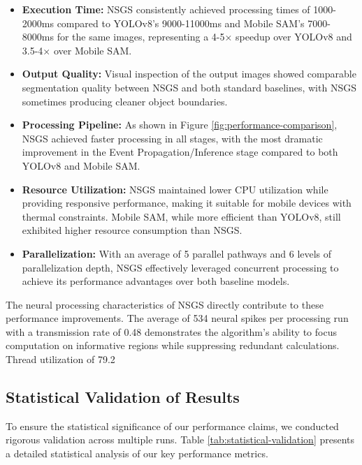 \documentclass[conference]{IEEEtran}
\begin{document}
\begin{itemize}
    \item \textbf{Execution Time:} NSGS consistently achieved processing times of 1000-2000ms compared to YOLOv8's 9000-11000ms and Mobile SAM's 7000-8000ms for the same images, representing a 4-5× speedup over YOLOv8 and 3.5-4× over Mobile SAM.
    
    \item \textbf{Output Quality:} Visual inspection of the output images showed comparable segmentation quality between NSGS and both standard baselines, with NSGS sometimes producing cleaner object boundaries.
    
    \item \textbf{Processing Pipeline:} As shown in Figure \ref{fig:performance-comparison}, NSGS achieved faster processing in all stages, with the most dramatic improvement in the Event Propagation/Inference stage compared to both YOLOv8 and Mobile SAM.
    
    \item \textbf{Resource Utilization:} NSGS maintained lower CPU utilization while providing responsive performance, making it suitable for mobile devices with thermal constraints. Mobile SAM, while more efficient than YOLOv8, still exhibited higher resource consumption than NSGS.
    
    \item \textbf{Parallelization:} With an average of 5 parallel pathways and 6 levels of parallelization depth, NSGS effectively leveraged concurrent processing to achieve its performance advantages over both baseline models.
\end{itemize}

The neural processing characteristics of NSGS directly contribute to these performance improvements. The average of 534 neural spikes per processing run with a transmission rate of 0.48 demonstrates the algorithm's ability to focus computation on informative regions while suppressing redundant calculations. Thread utilization of 79.2%

\subsection{Statistical Validation of Results}
To ensure the statistical significance of our performance claims, we conducted rigorous validation across multiple runs. Table \ref{tab:statistical-validation} presents a detailed statistical analysis of our key performance metrics.
\end{document}
